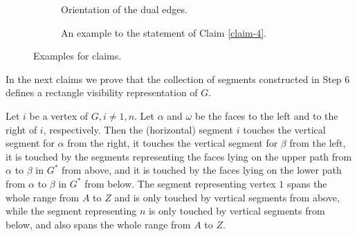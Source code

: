 \begin{figure}[!ht]
	\begin{subfigure}{0.45\textwidth}\centering
		\caption{Orientation of the dual edges.}
	\end{subfigure}
	\begin{subfigure}{0.45\textwidth}\centering
		\caption{An example to the statement of Claim \ref{claim-4}.}
	\end{subfigure}
	\caption{Examples for claims.}
	\label{fig-3}
\end{figure}

In the next claims we prove that the collection of segments constructed in Step 6 defines a rectangle visibility representation of $G$.

\begin{claim}
	Let $i$ be a vertex of $G, i \neq 1, n$. Let $\alpha$ and $\omega$ be the faces to the left and to the right of $i$, respectively. Then the (horizontal) segment $i$ touches the vertical segment for $\alpha$ from the right, it touches the vertical segment for $\beta$ from the left, it is touched by the segments representing the faces lying on the upper path from $\alpha$ to $\beta$ in $G^\ast$ from above, and it is touched by the faces lying on the lower path from $\alpha$ to $\beta$ in $G^\ast$ from below. The segment representing vertex $1$ spans the whole range from $A$ to $Z$ and is only touched by vertical segments from above, while the segment representing $n$ is only touched by vertical segments from below, and also spans the whole range from $A$ to $Z$.
	\label{claim-5}
\end{claim}


